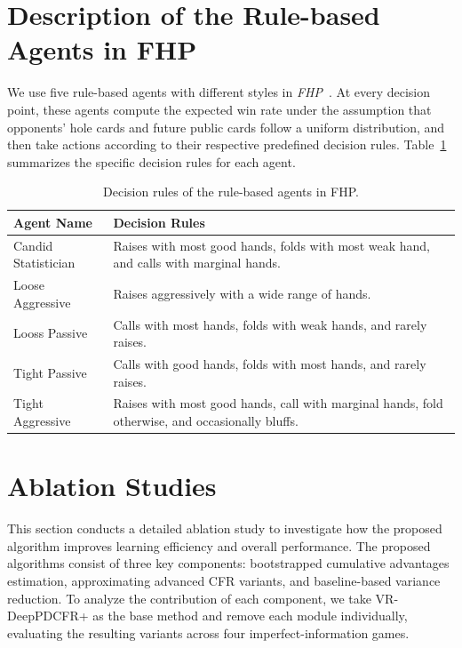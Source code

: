 \documentclass[letterpaper]{article} %
\begin{document}
\section{Description of the Rule-based Agents in FHP}
\label{app:rule_agents}
We use five rule-based agents with different styles in \textit{FHP}~\citep{li2018opponent}. At every decision point, these agents compute the expected win rate under the assumption that opponents' hole cards and future public cards follow a uniform distribution, and then take actions according to their respective predefined decision rules. Table~\ref{tab:agents} summarizes the specific decision rules for each agent.

\begin{table}[h]
	\centering
	\begin{tabular}{ll}
			\toprule 
            Agent Name               &  Decision Rules    \\ \midrule
            Candid Statistician &  Raises with most good hands, folds with most weak hand, and calls with marginal hands. \\
            Loose Aggressive & Raises aggressively with a wide range of hands.\\
            Looss Passive & Calls with most hands, folds with weak hands, and rarely raises.\\
            Tight Passive & Calls with good hands, folds with most hands, and rarely raises.\\
            Tight Aggressive & Raises with most good hands, call with marginal hands, fold otherwise, and occasionally bluffs.  \\
			\bottomrule
        \end{tabular}
    \caption{Decision rules of the rule-based agents in FHP.}
    \label{tab:agents}
\end{table}

\section{Ablation Studies}
\label{app:ablation}
This section conducts a detailed ablation study to investigate how the proposed algorithm improves learning efficiency and overall performance. The proposed algorithms consist of three key components: bootstrapped cumulative advantages  estimation, approximating advanced CFR variants, and baseline-based variance reduction. To analyze the contribution of each component, we take VR-DeepPDCFR+ as the base method and remove each module individually, evaluating the resulting variants across four imperfect-information games.
\end{document}
